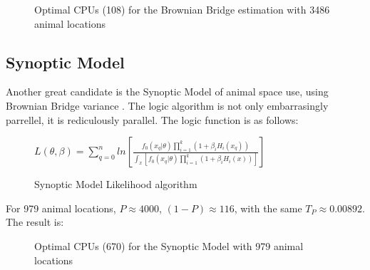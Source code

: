 \begin{figure}[h!]
        \begin{center}
                \caption{Optimal CPUs (108) for the Brownian Bridge estimation with 3486 animal locations}
                \label{opt_cpus_3486}
        \end{center}
\end{figure}

\subsection{Synoptic Model}
Another great candidate is the Synoptic Model of animal space use, using Brownian Bridge variance \cite{syn}.
The logic algorithm is not only embarrasingly parrellel, it is rediculously parallel. The logic function is as
follows:

\begin{figure}[h!]
        \begin{center}
                $L(\theta, \beta) = \sum_{q=0}^{n} ln[\frac{ f_0(x_q|\theta) \prod_{i=1}^k (1 + \beta_i H_i(x_q)) }{  \int_x [f_0(x_q|\theta) \prod_{i=1}^k (1 + \beta_i H_i(x))] }]$
                \caption{Synoptic Model Likelihood algorithm \cite{syn}}
                \label{bb_est}
        \end{center}
\end{figure}

For 979 animal locations, $P \approx 4000$, $(1 - P) \approx 116$, with the same $T_P \approx 0.00892$.
The result is:

\begin{figure}[h!]
        \begin{center}
                \caption{Optimal CPUs (670) for the Synoptic Model \cite{syn} with 979 animal locations}
                \label{opt_cpus_syn_979}
        \end{center}
\end{figure}


